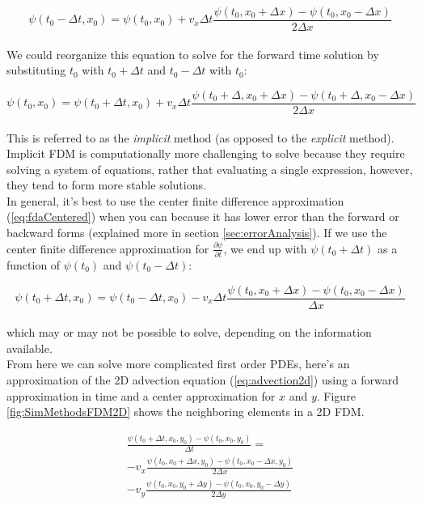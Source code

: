 {  \begin{equation}
  \psi(t_{0} - \Delta  t,  x_{0}) = \psi(t_{0}, x_{0}) + v_{x}\Delta t \frac{\psi(t_{0}, x_{0} + \Delta  x)-\psi(t_{0}, x_{0}-\Delta x)}{2\Delta  x}
  \end{equation}
  \\
  We could reorganize this equation to solve for the forward time solution by substituting $t_{0}$ with $t_{0}+\Delta t$ and $t_{0}-\Delta t$ with $t_{0}$:
  
  \begin{equation}
  \psi(t_{0},  x_{0}) = \psi(t_{0}+\Delta t, x_{0}) + v_{x}\Delta t \frac{\psi(t_{0}+\Delta, x_{0} + \Delta  x)-\psi(t_{0}+\Delta, x_{0}-\Delta x)}{2\Delta  x}
  \end{equation}
  \\
  This is referred to as the \textit{implicit} method (as opposed to the \textit{explicit} method).  Implicit FDM is computationally more challenging to solve because they require solving a system of equations, rather that evaluating a single expression, however, they tend to form more stable solutions.\\
  
  In general, it's best to use the center finite difference approximation (\ref{eq:fdaCentered}) when you can because it has lower error than the forward or backward forms (explained more in section \ref{sec:errorAnalysis}).  If we use the center finite difference approximation for $\frac{\partial \psi}{\partial t}$, we end up with $\psi(t_{0}+\Delta t)$ as a function of $\psi(t_{0})$ and $\psi(t_{0}-\Delta t)$:
  
     \begin{equation}
  \psi(t_{0} + \Delta  t,  x_{0}) = \psi(t_{0}-\Delta t, x_{0}) -v_{x}\Delta t \frac{\psi(t_{0}, x_{0} + \Delta  x)-\psi(t_{0}, x_{0}-\Delta x)}{\Delta  x}
  \end{equation}
  \\
  which may or may not be possible to solve, depending on the information available.\\
  
  From here we can solve more complicated first order PDEs, here's an approximation of the 2D advection equation (\ref{eq:advection2d}) using a forward approximation in time and a center approximation for $x$ and $y$.  Figure \ref{fig:SimMethodsFDM2D} shows the neighboring elements in a 2D FDM.
  
\begin{multline}
   \frac{ \psi(t_{0} + \Delta  t,  x_{0}, y_{0}) - \psi(t_{0}, x_{0}, y_{0})}{\Delta t} = \\
   -v_{x}\frac{\psi(t_{0}, x_{0} + \Delta  x, y_{0})-\psi(t_{0}, x_{0}-\Delta x, y_{0})}{2\Delta  x}\\
   -v_{y}\frac{\psi(t_{0}, x_{0}, y_{0} + \Delta  y)-\psi(t_{0}, x_{0}, y_{0}-\Delta y)}{2\Delta  y}
\end{multline}

}
